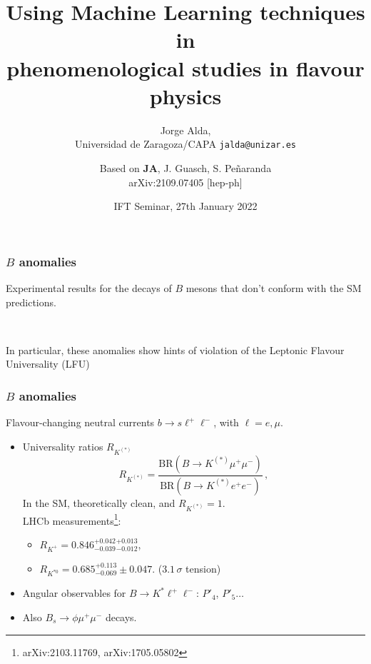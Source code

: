 \documentclass[mathserif, 10pt]{beamer}
\title[Using ML techniques in phenomenological studies in flavour physics]{Using Machine Learning techniques in\\ phenomenological studies in flavour physics}
\subtitle{Jorge Alda,\\ Universidad de Zaragoza/CAPA \hspace{4em} \texttt{jalda@unizar.es} }
\author[Jorge Alda]{Based on \textbf{JA}, J. Guasch, S. Peñaranda \\
arXiv:2109.07405 [hep-ph]}
\date[IFT Seminar]{IFT Seminar, 27th January 2022}
\begin{document}
\begin{frame}
\titlepage
\end{frame}

\begin{frame}
    \frametitle{$B$ anomalies}

    Experimental results for the decays of $B$ mesons that don't conform with the SM predictions.

    ~

    In particular, these anomalies show hints of violation of the Leptonic Flavour Universality (LFU)

\end{frame}

\begin{frame}
    \frametitle{$B$ anomalies}

    Flavour-changing neutral currents $b \to s \ell^+ \ell^-$, with $\ell = e, \mu$.
    \begin{itemize}
        \item Universality ratios $R_{K^{(*)}}$
              $$R_{K^{(*)}} = \frac{\mathrm{BR}(B\to K^{(*)}\mu^+ \mu^-)}{\mathrm{BR}(B\to K^{(*)}e^+ e^-)}\,, $$
              In the SM, theoretically clean, and $R_{K^{(*)}}=1$.\\
              LHCb measurements\footnote{arXiv:2103.11769, arXiv:1705.05802}:
              \begin{itemize}
                  \item $R_{K^+} = 0.846^{+0.042}_{-0.039}{}^{+0.013}_{-0.012}$,
                  \item $R_{K^{*0}} = 0.685^{+0.113}_{-0.069}\pm0.047$. ($3.1\,\sigma$ tension)
              \end{itemize}
        \item Angular observables for $B\to K^* \ell^+\ell^-$: $P'_4$, $P'_5\ldots$
        \item Also $B_s \to \phi \mu^+ \mu^-$ decays.
    \end{itemize}

\end{frame}
\end{document}
